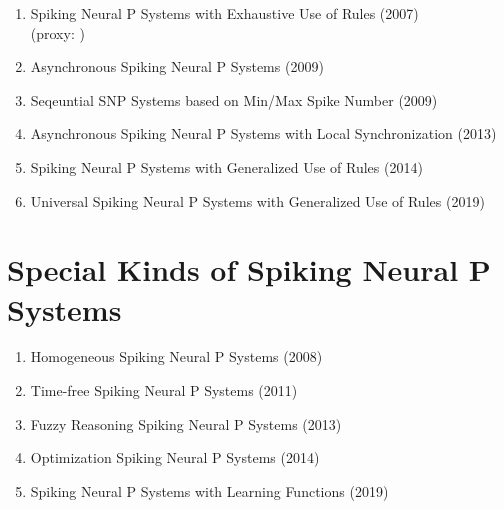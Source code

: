 \documentclass[a4paper]{article}
\begin{document}
\begin{enumerate}

\item Spiking Neural P Systems with Exhaustive Use of Rules (2007)
\cite{ionescu-2007-exhaustive}\\
(proxy: \cite{zhang-2008-lang-exhaustive})

\item Asynchronous Spiking Neural P Systems (2009)
\cite{cavaliere-2009-asynchronous}

\item Seqeuntial SNP Systems based on Min/Max Spike Number (2009)
\cite{ibarra-2009-min-max-sequential}

\item Asynchronous Spiking Neural P Systems with Local Synchronization (2013)
\cite{song-2013-local-sync}

\item Spiking Neural P Systems with Generalized Use of Rules (2014)
\cite{zhang-2014-general-rule-use}

\item Universal Spiking Neural P Systems with Generalized Use of Rules (2019)
\cite{jiang-2019-improved-usnp-general-rule-use}

\end{enumerate}



\section{Special Kinds of Spiking Neural P Systems}

\begin{enumerate}

\item Homogeneous Spiking Neural P Systems (2008)
\cite{zeng-2009-snp-homo}

\item Time-free Spiking Neural P Systems (2011)
\cite{pan-2011-time-free}

\item Fuzzy Reasoning Spiking Neural P Systems (2013)
\cite{peng-2013-fuzzy-snp}

\item Optimization Spiking Neural P Systems (2014)
\cite{zhang-2014-optimization-snp}

\item Spiking Neural P Systems with Learning Functions (2019)
\cite{song-2019-learning-functions}

\end{enumerate}
\end{document}
